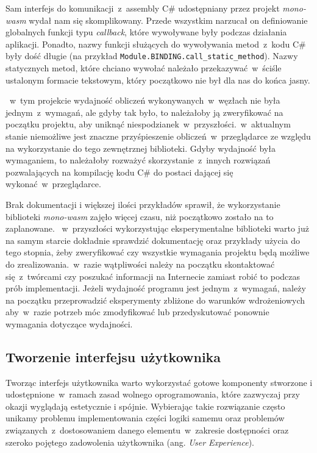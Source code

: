 \documentclass[a4paper,11pt,twoside]{report}
\theoremstyle{definition}
\begin{document}
            Sam interfejs do komunikacji~z~assembly C\# udostępniany przez projekt \textit{mono-wasm} wydał nam się skomplikowany. Przede wszystkim narzucał on definiowanie globalnych funkcji typu \textit{callback}, które wywoływane były podczas działania aplikacji. Ponadto, nazwy funkcji służących do wywoływania metod~z~kodu C\# były dość długie (na przykład \texttt{Module.BINDING.call\_static\_method}). Nazwy statycznych metod, które chciano wywołać należało przekazywać~w~ściśle ustalonym formacie tekstowym, który początkowo nie był dla nas do końca jasny.
            
           ~w~tym projekcie wydajność obliczeń wykonywanych~w~węzłach nie była jednym~z~wymagań, ale gdyby tak było, to należałoby ją zweryfikować na początku projektu, aby uniknąć niespodzianek~w~przyszłości.~w~aktualnym stanie niemożliwe jest znaczne przyśpieszenie obliczeń~w~przeglądarce ze względu na wykorzystanie do tego zewnętrznej biblioteki. Gdyby wydajność była wymaganiem, to należałoby rozważyć skorzystanie~z~innych rozwiązań pozwalających na kompilację kodu C\# do postaci dającej się wykonać~w~przeglądarce.
            
            Brak dokumentacji i większej ilości przykładów sprawił, że wykorzystanie biblioteki \textit{mono-wasm} zajęło więcej czasu, niż początkowo zostało na to zaplanowane.
           ~w~przyszłości wykorzystując eksperymentalne biblioteki warto już na samym starcie dokładnie sprawdzić dokumentację oraz przykłady użycia do tego stopnia, żeby zweryfikować czy wszystkie wymagania projektu będą możliwe do zrealizowania.~w~razie wątpliwości należy na początku skontaktować się~z~twórcami czy poszukać informacji na Internecie zamiast robić to podczas prób implementacji.
            Jeżeli wydajność programu jest jednym~z~wymagań, należy na początku przeprowadzić eksperymenty zbliżone do warunków wdrożeniowych aby~w~razie potrzeb móc zmodyfikować lub przedyskutować ponownie wymagania dotyczące wydajności.
        
        \subsection{Tworzenie interfejsu użytkownika}
            Tworząc interfejs użytkownika warto wykorzystać gotowe komponenty stworzone i udostępnione~w~ramach zasad wolnego oprogramowania, które zazwyczaj przy okazji wyglądają estetycznie i spójnie. Wybierając takie rozwiązanie często unikamy problemu implementowania części logiki samemu oraz problemów związanych~z~dostosowaniem danego elementu~w~zakresie dostępności oraz szeroko pojętego zadowolenia użytkownika (ang. {\textit{User Experience})}.
            
\end{document}
